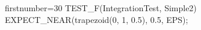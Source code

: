 \begin{cppcode*}{firstnumber=30}
TEST_F(IntegrationTest, Simple2) {
  EXPECT_NEAR(trapezoid(0, 1, 0.5), 0.5, EPS);
}
\end{cppcode*}
